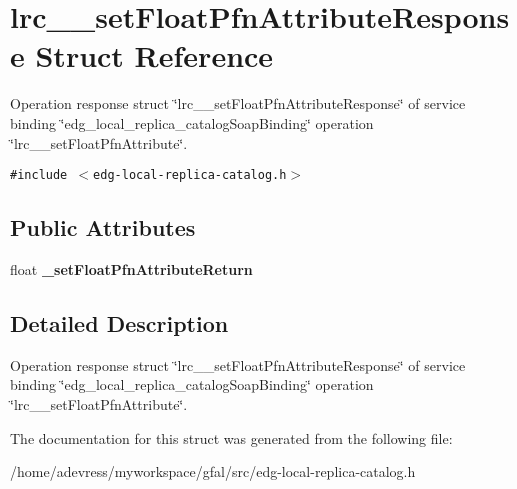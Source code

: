 \section{lrc\_\-\_\-set\-Float\-Pfn\-Attribute\-Response Struct Reference}
\label{structlrc____setFloatPfnAttributeResponse}
Operation response struct \char`\"{}lrc\_\-\_\-set\-Float\-Pfn\-Attribute\-Response\char`\"{} of service binding \char`\"{}edg\_\-local\_\-replica\_\-catalog\-Soap\-Binding\char`\"{} operation \char`\"{}lrc\_\-\_\-set\-Float\-Pfn\-Attribute\char`\"{}.  


{\tt \#include $<$edg-local-replica-catalog.h$>$}

\subsection*{Public Attributes}
\begin{CompactItemize}
\item 
float \textbf{\_\-set\-Float\-Pfn\-Attribute\-Return}\label{structlrc____setFloatPfnAttributeResponse_0bc49d641b003fb578915d7f46bf7603}

\end{CompactItemize}


\subsection{Detailed Description}
Operation response struct \char`\"{}lrc\_\-\_\-set\-Float\-Pfn\-Attribute\-Response\char`\"{} of service binding \char`\"{}edg\_\-local\_\-replica\_\-catalog\-Soap\-Binding\char`\"{} operation \char`\"{}lrc\_\-\_\-set\-Float\-Pfn\-Attribute\char`\"{}. 



The documentation for this struct was generated from the following file:\begin{CompactItemize}
\item 
/home/adevress/myworkspace/gfal/src/edg-local-replica-catalog.h\end{CompactItemize}
